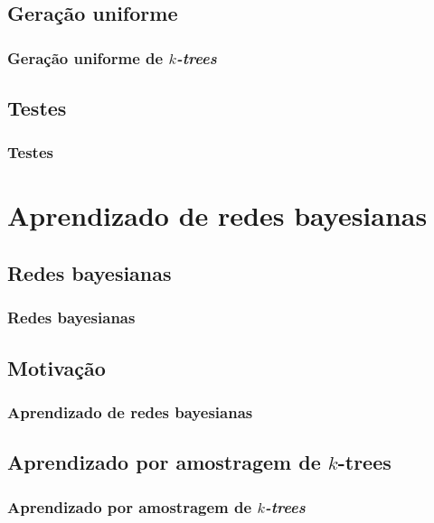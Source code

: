 \documentclass{beamer}
\begin{document}
  \subsection{Geração uniforme}

  \begin{frame}
    \frametitle{Geração uniforme de \emph{$k$-trees}}

  \end{frame}

  \subsection{Testes}

  \begin{frame}
    \frametitle{Testes}

  \end{frame}

  \section{Aprendizado de redes bayesianas}

  \subsection{Redes bayesianas}

  \begin{frame}
    \frametitle{Redes bayesianas}

  \end{frame}

  \subsection{Motivação}

  \begin{frame}
    \frametitle{Aprendizado de redes bayesianas}

  \end{frame}

  \subsection{Aprendizado por amostragem de $k$-trees}

  \begin{frame}
    \frametitle{Aprendizado por amostragem de \emph{$k$-trees}}

  \end{frame}
\end{document}
